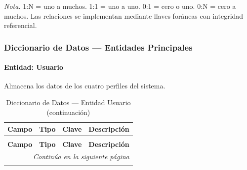 \textit{Nota.} 1:N = uno a muchos. 1:1 = uno a uno. 0:1 = cero o uno. 0:N = cero a muchos. Las relaciones se implementan mediante llaves foráneas con integridad referencial.

\newpage\subsubsection{Diccionario de Datos --- Entidades Principales}

\paragraph{Entidad: Usuario} Almacena los datos de los cuatro perfiles del sistema.

\begin{longtable}{p{3.5cm} p{2.5cm} p{1.5cm} p{6.5cm}}
\caption{Diccionario de Datos --- Entidad Usuario} \\
\toprule
\textbf{Campo} & \textbf{Tipo} & \textbf{Clave} & \textbf{Descripción} \\
\midrule
\endfirsthead

\caption[]{Diccionario de Datos --- Entidad Usuario (continuación)} \\
\toprule
\textbf{Campo} & \textbf{Tipo} & \textbf{Clave} & \textbf{Descripción} \\
\midrule
\endhead

\midrule
\multicolumn{4}{r}{\footnotesize\textit{Continúa en la siguiente página}} \\
\endfoot

\bottomrule
\endlastfoot


\end{longtable}
